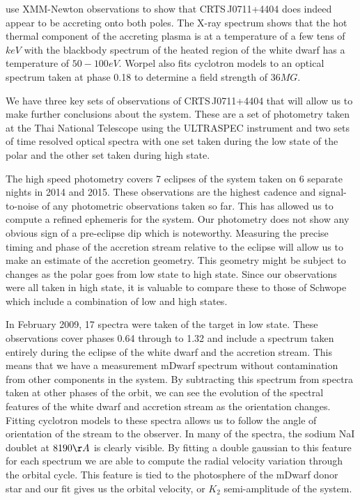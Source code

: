 \documentclass[a4paper,fleqn,usenatbib]{mnras}
\begin{document}
\citet{Worpel2015} use XMM-Newton observations to show that CRTS\,J0711+4404 does indeed appear to be accreting onto both poles. The X-ray spectrum shows that the hot thermal component of the accreting plasma is at a temperature of a few tens of $keV$ with the blackbody spectrum of the heated region of the white dwarf has a temperature of $50-100 eV$. Worpel also fits cyclotron models to an optical spectrum taken at phase 0.18 to determine a field strength of $36MG$. 

We have three key sets of observations of CRTS\,J0711+4404 that will allow us to make further conclusions about the system. These are a set of photometry taken at the Thai National Telescope using the ULTRASPEC instrument and two sets of time resolved optical spectra with one set taken during the low state of the polar and the other set taken during high state. 

The high speed photometry covers 7 eclipses of the system taken on 6 separate nights in 2014 and 2015. These observations are the highest cadence and signal-to-noise of any photometric observations taken so far. This has allowed us to compute a refined ephemeris for the system. Our photometry does not show any obvious sign of a pre-eclipse dip which is noteworthy. Measuring the precise timing and phase of the accretion stream relative to the eclipse will allow us to make an estimate of the accretion geometry. This geometry might be subject to changes as the polar goes from low state to high state. Since our observations were all taken in high state, it is valuable to compare these to those of Schwope which include a combination of low and high states. 

In February 2009, 17 spectra were taken of the target in low state. These observations cover phases 0.64 through to 1.32 and include a spectrum taken entirely during the eclipse of the white dwarf and the accretion stream. This means that we have a measurement mDwarf spectrum without contamination from other components in the system. By subtracting this spectrum from spectra taken at other phases of the orbit, we can see the evolution of the spectral features of the white dwarf and accretion stream as the orientation changes. Fitting cyclotron models to these spectra allows us to follow the angle of orientation of the stream to the observer. In many of the spectra, the sodium NaI doublet at $8190 \AA$ is clearly visible. By fitting a double gaussian to this feature for each spectrum we are able to compute the radial velocity variation through the orbital cycle. This feature is tied to the photosphere of the mDwarf donor star and our fit gives us the orbital velocity, or $K_2$ semi-amplitude of the system. 
\end{document}
